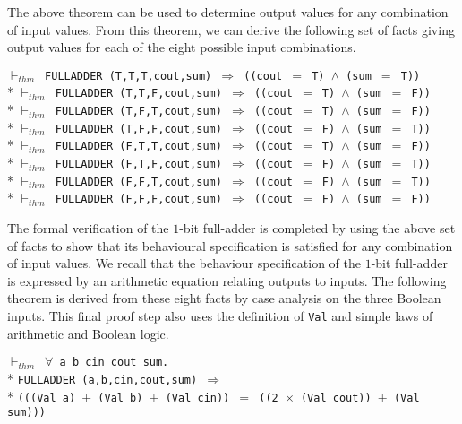 \begin{normalsize}
The above theorem can be used to determine output values
for any combination of input values.
From this theorem, we can derive the following set of facts giving
output values for each of the eight possible input combinations.

\begin{minipage}{17cm}
$\vdash_{thm}$\verb" FULLADDER (T,T,T,cout,sum) "$\Longrightarrow$\verb" ((cout "$=$\verb" T) "$\wedge$\verb" (sum "$=$\verb" T))"\\*
$\vdash_{thm}$\verb" FULLADDER (T,T,F,cout,sum) "$\Longrightarrow$\verb" ((cout "$=$\verb" T) "$\wedge$\verb" (sum "$=$\verb" F))"\\*
$\vdash_{thm}$\verb" FULLADDER (T,F,T,cout,sum) "$\Longrightarrow$\verb" ((cout "$=$\verb" T) "$\wedge$\verb" (sum "$=$\verb" F))"\\*
$\vdash_{thm}$\verb" FULLADDER (T,F,F,cout,sum) "$\Longrightarrow$\verb" ((cout "$=$\verb" F) "$\wedge$\verb" (sum "$=$\verb" T))"\\*
$\vdash_{thm}$\verb" FULLADDER (F,T,T,cout,sum) "$\Longrightarrow$\verb" ((cout "$=$\verb" T) "$\wedge$\verb" (sum "$=$\verb" F))"\\*
$\vdash_{thm}$\verb" FULLADDER (F,T,F,cout,sum) "$\Longrightarrow$\verb" ((cout "$=$\verb" F) "$\wedge$\verb" (sum "$=$\verb" T))"\\*
$\vdash_{thm}$\verb" FULLADDER (F,F,T,cout,sum) "$\Longrightarrow$\verb" ((cout "$=$\verb" F) "$\wedge$\verb" (sum "$=$\verb" T))"\\*
$\vdash_{thm}$\verb" FULLADDER (F,F,F,cout,sum) "$\Longrightarrow$\verb" ((cout "$=$\verb" F) "$\wedge$\verb" (sum "$=$\verb" F))"
\end{minipage}

The formal verification of the \mbox{$1$-bit} \mbox{full-adder} is completed
by using the above set of facts to show that its
behavioural specification is satisfied
for any combination of input values.
We recall that the behaviour specification of the
\mbox{$1$-bit} \mbox{full-adder}
is expressed by an arithmetic equation relating outputs to inputs.
The following theorem is derived from these eight facts by
case analysis on the three Boolean inputs.
This final proof step also uses the definition of \verb"Val"
and simple laws of arithmetic and Boolean logic.

\begin{minipage}{17cm}
$\vdash_{thm}$\verb" "$\forall$\verb" a b cin cout sum."\\*
\verb"FULLADDER (a,b,cin,cout,sum) "$\Longrightarrow$\\*
\verb"(((Val a) "$+$\verb" (Val b) "$+$\verb" (Val cin)) "$=$\verb" ((2 "$\times$\verb" (Val cout)) "$+$\verb" (Val sum)))"
\end{minipage}


\end{normalsize}
